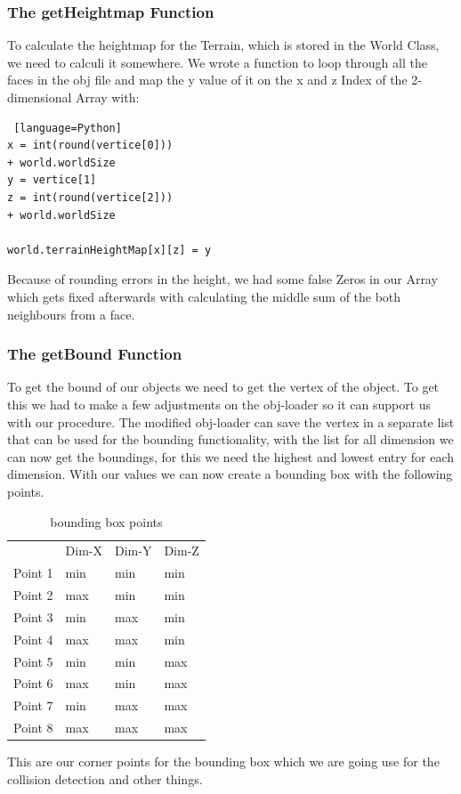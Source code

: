 \documentclass{sig-alternate-05-2015}
\begin{document}
\subsubsection{The getHeightmap Function}
To calculate the heightmap for the Terrain, which is stored in the World Class, we need to calculi it somewhere. We wrote a function to loop through all the faces in the obj file and map the y value of it on the x and z Index of the 2-dimensional Array with:\\
\begin{lstlisting} [language=Python]
x = int(round(vertice[0])) 
+ world.worldSize
y = vertice[1]
z = int(round(vertice[2])) 
+ world.worldSize

world.terrainHeightMap[x][z] = y

\end{lstlisting}
Because of rounding errors in the height, we had some false Zeros in our Array which gets fixed afterwards with calculating the middle sum of the both neighbours from a face.\\
\subsubsection{The getBound Function}
To get the bound of our objects we need to get the vertex of the object. To get this we had to make a few adjustments on the obj-loader so it can support us with our procedure. The modified obj-loader can save the vertex in a separate list that can be used for the bounding functionality, with the list for all dimension we can now get the boundings, for this we need the highest and lowest entry for each dimension. With our values we can now create a bounding box with the following points.
\begin{table}[!htbp]
\centering
\begin{tabular}{llll}
        & Dim-X & Dim-Y & Dim-Z \\
Point 1 & min   & min   & min   \\
Point 2 & max   & min   & min   \\
Point 3 & min   & max   & min   \\
Point 4 & max   & max   & min   \\
Point 5 & min   & min   & max   \\
Point 6 & max   & min   & max   \\
Point 7 & min   & max   & max   \\
Point 8 & max   & max   & max  
\end{tabular}
\caption{bounding box points}
\label{my-label}
\end{table}
This are our corner points for the bounding box which we are going use for the collision detection and other things.
\end{document}
